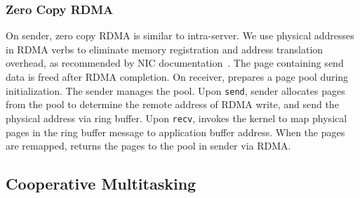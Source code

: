 \subsubsection{Zero Copy RDMA}
\label{subsec:zero-copy-rdma}

On sender, zero copy RDMA is similar to intra-server. We use physical addresses in RDMA verbs to eliminate memory registration and address translation overhead, as recommended by NIC documentation~\cite{mellanox-zerocopy}. The page containing send data is freed after RDMA completion. On receiver, \libipc{} prepares a page pool during initialization. The sender manages the pool. Upon \texttt{send}, sender allocates pages from the pool to determine the remote address of RDMA write, and send the physical address via ring buffer. Upon \texttt{recv}, \libipc invokes the kernel to map physical pages in the ring buffer message to application buffer address. When the pages are remapped, \libipc{} returns the pages to the pool in sender via RDMA.

%

\subsection{Cooperative Multitasking}
\label{subsec:process-mux}

